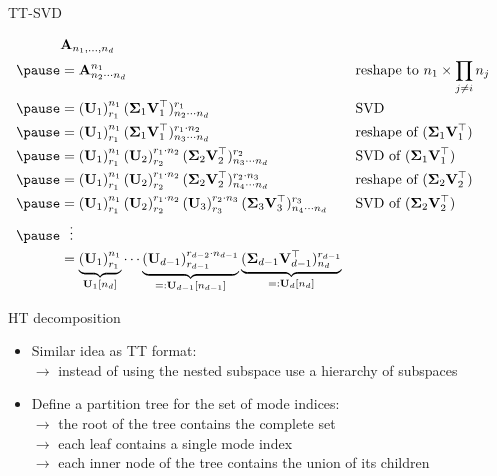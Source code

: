 \documentclass{beamer}
\newcommand{\bgk}[1]{\boldsymbol{#1}}
\newcommand{\bSigma}{\bgk{\Sigma}}
\newcommand{\bvec}[1]{\mathbf{#1}}
\newcommand{\vA}{\bvec{A}}
\newcommand{\vU}{\bvec{U}}
\newcommand{\vV}{\bvec{V}}
\newcommand{\bitem}{\item[$\bullet$]}
\begin{document}
\begin{frame}{TT-SVD}

$$
\begin{aligned}
&\vA_{n_1,...,n_d}\\
\pause
&=
\vA_{n_2\cdots n_d}^{n_1} &&\text{reshape to}~n_1 \times \prod_{j\neq i} n_j\\ \pause
&=
\left(\vU_1\right)_{r_1}^{n_1} (\bSigma_1 \vV_1^\top)_{n_2\cdots n_d}^{r_1}&&\text{SVD}\\ \pause
&=
\left(\vU_1\right)_{r_1}^{n_1}
(\bSigma_1\vV_1^\top)_{n_3\cdots n_d}^{r_1 \cdot n_2}&&\text{reshape of}~ (\bSigma_1\vV_1^\top)\\ \pause
&=
\left(\vU_1\right)_{r_1}^{n_1}
\left(\vU_2\right)^{r_1 \cdot n_2}_{r_2} 
(\bSigma_2\vV_2^\top)_{n_3\cdots n_d}^{r_2}&&\text{SVD of}~ (\bSigma_1\vV_1^\top)\\ \pause
&=
\left(\vU_1\right)_{r_1}^{n_1}
\left(\vU_2\right)^{r_1 \cdot n_2}_{r_2} 
(\bSigma_2\vV_2^\top)_{n_4\cdots n_d}^{r_2\cdot n_3 }&&\text{reshape of}~ (\bSigma_2\vV_2^\top)\\ \pause
&=
\left(\vU_1\right)_{r_1}^{n_1}
\left(\vU_2\right)^{r_1 \cdot n_2}_{r_2}
\left(\vU_3\right)^{r_2 \cdot n_3}_{r_3}
(\bSigma_3\vV_3^\top)_{n_4\cdots n_d}^{r_3}&&\text{SVD of}~ (\bSigma_2\vV_2^\top)\\ \pause
&~~\vdots\\
&=
\underbrace{\left(\vU_1\right)_{r_1}^{n_1}}_{\vU_1[n_d]}
\cdots
\underbrace{\left(\vU_{d-1}\right)^{r_{d-2} \cdot n_{d-1}}_{r_{d-1}}}_{=:\vU_{d-1}[n_{d-1}]}
\underbrace{(\bSigma_{d-1}\vV_{d-1}^\top)_{n_d}^{r_{d-1}}}_{=:\vU_{d}[n_d]}
\end{aligned}
$$
    
\end{frame}


\begin{frame}{HT decomposition}

\begin{itemize}
    \bitem Similar idea as TT format:\\ 
    $\rightarrow$ instead of using the nested subspace use a hierarchy of subspaces 
    \bitem  Define a partition tree for the set of mode indices: \\
    $\rightarrow$ the root of the tree contains the complete set \\ 
    $\rightarrow$ each leaf contains a single mode index\\ 
    $\rightarrow$ each inner node of the tree contains the union of its children
\end{itemize}
    
\end{frame}
\end{document}
